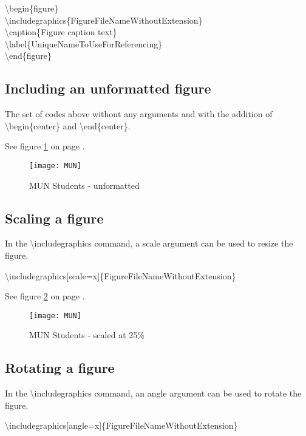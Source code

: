 \documentclass[12pt]{MUNThesisBibTeX}
\begin{document}
\textbackslash begin\{figure\}\\
\textbackslash includegraphics\{FigureFileNameWithoutExtension\}\\
\textbackslash caption\{Figure caption text\}\\
\textbackslash label\{UniqueNameToUseForReferencing\}\\
\textbackslash end\{figure\}\\

\subsection{Including an unformatted figure}
The set of codes above without any arguments and with the addition of \textbackslash begin\{center\} and \textbackslash end\{center\}.\medskip

See figure \ref{MUNFullSize} on page \pageref{MUNFullSize}.\medskip

\begin{figure}
\begin{center}
\texttt{[image: MUN]}
\caption{MUN Students - unformatted}
\label{MUNFullSize}
\end{center}
\end{figure}

\subsection{Scaling a figure}
In the \textbackslash includegraphics command, a scale argument can be used to resize the figure.\medskip

\textbackslash includegraphics[scale=x]\{FigureFileNameWithoutExtension\}\medskip

See figure \ref{MUNScaled} on page \pageref{MUNScaled}.\medskip

\begin{figure}
\begin{center}
\texttt{[image: MUN]}
\caption{MUN Students - scaled at 25\%}
\label{MUNScaled}
\end{center}
\end{figure}

\subsection{Rotating a figure}
In the \textbackslash includegraphics command, an angle argument can be used to rotate the figure.\medskip

\textbackslash includegraphics[angle=x]\{FigureFileNameWithoutExtension\}\medskip
\end{document}
